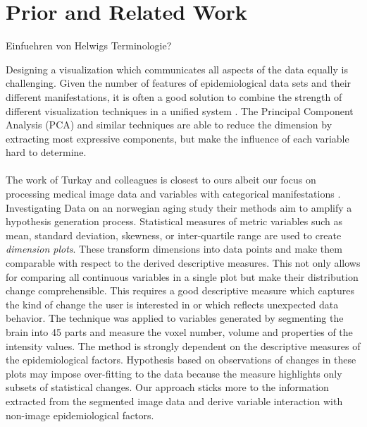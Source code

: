 \documentclass[journal]{style/vgtc} 			          %
\begin{document}
\section{Prior and Related Work}
Einfuehren von Helwigs Terminologie?

Designing a visualization which communicates all aspects of the data equally is challenging.
%
Given the number of features of epidemiological data sets and their different manifestations, it is often a good solution to combine the strength of different visualization techniques in a unified system \cite{Buja91, Konyha2009}.
%
The Principal Component Analysis (PCA) and similar techniques are able to reduce the dimension by extracting most expressive components, but make the influence of each variable hard to determine.
\\\\
The work of Turkay and colleagues is closest to ours albeit our focus on processing medical image data and variables with categorical manifestations \cite{Turkay2013}.
%
Investigating Data on an norwegian aging study their methods aim to amplify a hypothesis generation process.
%
Statistical measures of metric variables such as mean, standard deviation, skewness, or inter-quartile range are used to create \emph{dimension plots}.
%
These transform dimensions into data points and make them comparable with respect to the derived descriptive measures.
%
This not only allows for comparing all continuous variables in a single plot but make their distribution change comprehensible.
%
This requires a good descriptive measure which captures the kind of change the user is interested in or which reflects unexpected data behavior.
%
The technique was applied to variables generated by segmenting the brain into 45 parts and measure the voxel number, volume and properties of the intensity values.
%
The method is strongly dependent on the descriptive measures of the epidemiological factors.
%
Hypothesis based on observations of changes in these plots may impose over-fitting to the data because the measure highlights only subsets of statistical changes.
%
Our approach sticks more to the information extracted from the segmented image data and derive variable interaction with non-image epidemiological factors.
\end{document}
